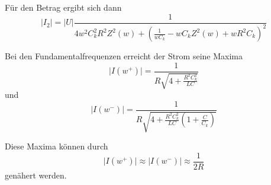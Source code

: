 Für den Betrag ergibt sich dann
\begin{equation}
    \lvert I_2\rvert = \lvert U\rvert \frac{1}{ 4w^2C_k^2R^2Z^2(w) + ( \frac{1}{wC_k} - wC_kZ^2(w) + wR^2C_k )^2 }
    \label{eqn:Zwanzig}
\end{equation}

Bei den Fundamentalfrequenzen erreicht der Strom seine Maxima
\begin{equation}
    \lvert I(w^{+})\rvert = \frac{1}{ R\sqrt{4 + \frac{R^2C_k^2}{LC}}}
    \label{eqn:Einundzwandzig}
\end{equation}
und
\begin{equation}
    \lvert I(w^{-})\rvert = \frac{1}{ R\sqrt{4 + \frac{R^2C_k^2}{LC}(1+\frac{C}{C_k})}}
    \label{eqn:Zweiundzwandzig}
\end{equation}

Diese Maxima können durch 
\begin{equation}
    \lvert I(w^{+})\rvert \approx \lvert I(w^{-})\rvert \approx \frac{1}{2R}
    \label{eqn:Dreiundzwandzig}
\end{equation}
genähert werden.


